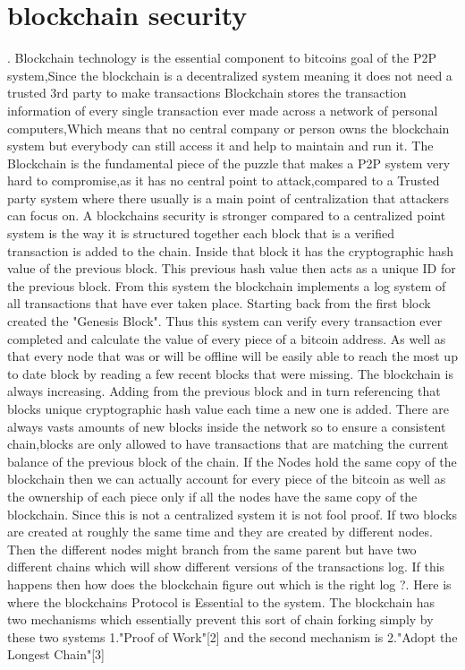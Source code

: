 \documentclass[report]{IEEEtran}
\begin{document}
\section{blockchain security}.\newline
Blockchain technology is the essential component to bitcoins goal of the P2P system,Since the blockchain is a decentralized system meaning it does not need a trusted 3rd party to make transactions \newline Blockchain stores the transaction information of every single transaction ever made across a network of personal computers,Which means that no central company or person owns the blockchain system but everybody can still access it and help to maintain and run it. The Blockchain is the fundamental piece of the puzzle that makes a P2P system very hard to compromise,as it has no central point to attack,compared to a Trusted party system where there usually is a main point of centralization that attackers can focus on. A blockchains security is stronger compared to a centralized point system is the way it is structured together each block that is a verified transaction is added to the chain. Inside that block it has the cryptographic hash value of the previous block. This previous hash value then acts as a unique ID for the previous block. From this system the blockchain implements a log system of all transactions that have ever taken place. Starting back from the first block created the "Genesis Block". Thus this system can verify every transaction ever completed and calculate the value of every piece of a bitcoin address. As well as that every node that was or will be offline will be easily able to reach the most up to date  block by reading a few recent blocks that were missing. The blockchain is always increasing. Adding from the previous block and in turn referencing that blocks unique cryptographic hash value each time a new one is added. There are always vasts amounts of new blocks inside the network so to ensure a consistent chain,blocks are only allowed to have transactions that are matching the current balance of the previous block of the chain. If the Nodes hold the same copy of the blockchain then we can actually account for every piece of the bitcoin as well as the ownership of each piece only if all the nodes have the same copy of the blockchain. Since this is not a centralized system it is not fool proof. If two blocks are created at roughly the same time and they are created by different nodes. Then the different nodes might branch from the same parent but have two different chains which will show different versions of the transactions log. If this happens then how does the blockchain figure out which is the right log ?. Here is where the blockchains Protocol is Essential to the system. The blockchain has two mechanisms which essentially prevent this sort of chain forking simply by these two systems 1."Proof of Work"[2]
and the second mechanism is 2."Adopt the Longest Chain"[3]
\end{document}
